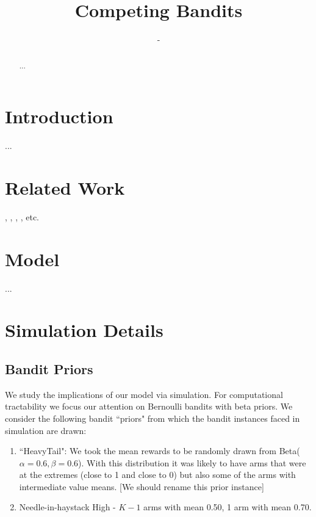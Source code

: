 \documentclass{article}
\title{Competing Bandits}
\author{-}
\theoremstyle{definition}
\begin{document}
\maketitle

\begin{abstract}
...
\end{abstract}

\section{Introduction}
\label{S:1}

...

\section{Related Work}
\label{S:2}

\citealt*{mansour2017competing}, \citealt*{che2017recommender}, \citealt*{kremer2014implementing}, \citealt*{mansour2015bayesian}, etc.

\section{Model}
\label{S:3}

...

\section{Simulation Details}
\label{S:4}

\subsection{Bandit Priors}
We study the implications of our model via simulation. For computational tractability we focus our attention on Bernoulli bandits with beta priors. We consider the following bandit ``priors" from which the bandit instances faced in simulation are drawn:
\begin{enumerate}
\item ``HeavyTail": We took the mean rewards to be randomly drawn from Beta($\alpha=0.6,\beta=0.6$). With this distribution it was likely to have arms that were at the extremes (close to 1 and close to 0) but also some of the arms with intermediate value means. [We should rename this prior instance]
\item Needle-in-haystack High - $K-1$ arms with mean 0.50, 1 arm with mean 0.70. 
\end{enumerate}
\end{document}
